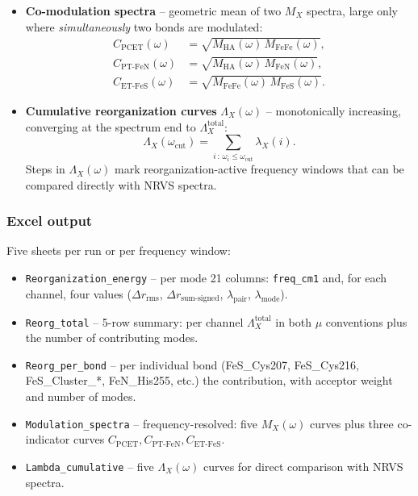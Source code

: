 \documentclass[11pt,a4paper,twoside]{article}
\theoremstyle{remark}
\begin{document}
\begin{itemize}
  \item \textbf{Co-modulation spectra} -- geometric mean of two
        $M_X$ spectra, large only where \emph{simultaneously}
        two bonds are modulated:
        \begin{align}
          C_\text{PCET}(\omega) &= \sqrt{M_\text{HA}(\omega)\, M_\text{FeFe}(\omega)},\\
          C_{\text{PT-FeN}}(\omega) &= \sqrt{M_\text{HA}(\omega)\, M_\text{FeN}(\omega)},\\
          C_{\text{ET-FeS}}(\omega) &= \sqrt{M_\text{FeFe}(\omega)\, M_\text{FeS}(\omega)}.
        \end{align}

  \item \textbf{Cumulative reorganization curves} $\Lambda_X(\omega)$
        -- monotonically increasing, converging at the spectrum end
        to $\Lambda_X^\text{total}$:
        \begin{equation}
          \Lambda_X(\omega_\text{cut})
          = \sum_{i\,:\,\omega_i \le \omega_\text{cut}} \lambda_X(i).
        \end{equation}
        Steps in $\Lambda_X(\omega)$ mark reorganization-active
        frequency windows that can be compared directly with NRVS
        spectra.
\end{itemize}

\subsubsection*{Excel output}
\label{sec:reorg-excel}

Five sheets per run or per frequency window:

\begin{itemize}
  \item \texttt{Reorganization\_energy} -- per mode 21 columns:
        \texttt{freq\_cm1} and, for each channel, four values
        ($\Delta r_\text{rms}$, $\Delta r_\text{sum-signed}$,
        $\lambda_\text{pair}$, $\lambda_\text{mode}$).

  \item \texttt{Reorg\_total} -- 5-row summary: per channel
        $\Lambda_X^\text{total}$ in both $\mu$ conventions plus
        the number of contributing modes.

  \item \texttt{Reorg\_per\_bond} -- per individual bond
        (FeS\_Cys207, FeS\_Cys216, FeS\_Cluster\_*, FeN\_His255,
        etc.) the contribution, with acceptor weight and number
        of modes.

  \item \texttt{Modulation\_spectra} -- frequency-resolved: five
        $M_X(\omega)$ curves plus three co-indicator curves
        $C_\text{PCET}, C_\text{PT-FeN}, C_\text{ET-FeS}$.

  \item \texttt{Lambda\_cumulative} -- five $\Lambda_X(\omega)$
        curves for direct comparison with NRVS spectra.
\end{itemize}
\end{document}
